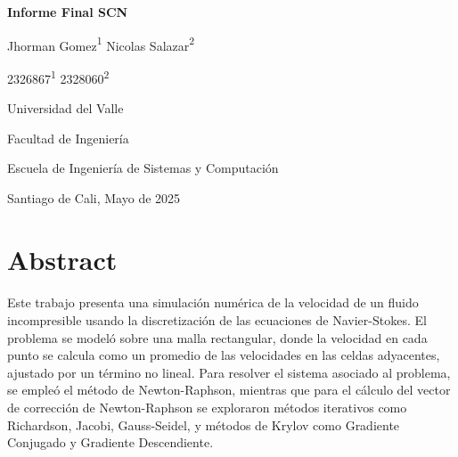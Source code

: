 \documentclass{article}
\begin{document}
  \begin{titlepage}
    \centering
    \vspace*{2cm}
    
    \Huge
    \textbf{Informe Final SCN}
    
    \vspace{1.5cm}
    
    \Large
    Jhorman Gomez{\textsuperscript{1}}
    Nicolas Salazar{\textsuperscript{2}}
    
    \vspace{0.5cm}
    
    \large

    2326867{\textsuperscript{1}}
    2328060{\textsuperscript{2}}
  
    
    \vspace{0.5cm}
    
    \Large
    Universidad del Valle
    
    \vspace{0.5cm}
    
    \large
    Facultad de Ingeniería
    
    \vspace{0.5cm}
    
    \large
    Escuela de Ingeniería de Sistemas y Computación
    
    \vspace{0.5cm}
    
    \large
    Santiago de Cali, Mayo de 2025
    
  \end{titlepage}

  \section*{Abstract}
  \paragraph{}
  Este trabajo presenta una simulación numérica de la velocidad de un fluido incompresible usando la discretización de las ecuaciones de Navier-Stokes. El problema se modeló sobre una malla rectangular, donde la velocidad en cada punto se calcula como un promedio de las velocidades en las celdas adyacentes, ajustado por un término no lineal. Para resolver el sistema asociado al problema, se empleó el método de Newton-Raphson, mientras que para el cálculo del vector de corrección de Newton-Raphson se exploraron métodos iterativos como Richardson, Jacobi, Gauss-Seidel, y métodos de Krylov como Gradiente Conjugado y Gradiente Descendiente.
\end{document}
